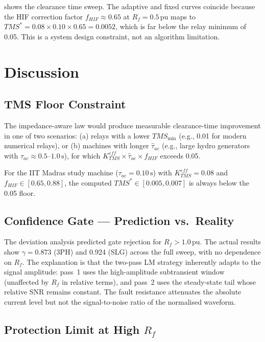 \documentclass[12pt,a4paper]{article}
\theoremstyle{definition}
\theoremstyle{plain}
\begin{document}
 shows the clearance time sweep.  The adaptive and fixed
curves coincide because the HIF correction factor $f_{HIF} \approx 0.65$
at $R_f = 0.5\,\text{pu}$ maps to $TMS^* = 0.08 \times 0.10 \times 0.65
= 0.0052$, which is far below the relay minimum of 0.05.  This is a
system design constraint, not an algorithm limitation.

\section{Discussion}
\label{sec:disc}

\subsection{TMS Floor Constraint}
\label{sec:disc:floor}

The impedance-aware law would produce measurable clearance-time improvement
in one of two scenarios: (a) relays with a lower $TMS_{\min}$ (e.g., 0.01 for
modern numerical relays), or (b) machines with longer $\hat{\tau}_{ac}$
(e.g., large hydro generators with $\tau_{ac} \approx 0.5$--$1.0\,\text{s}$),
for which $K_{TMS}^{eff} \times \hat{\tau}_{ac} \times f_{HIF}$ exceeds 0.05.

For the IIT Madras study machine ($\tau_{ac} = 0.10\,\text{s}$) with
$K_{TMS}^{eff} = 0.08$ and $f_{HIF} \in [0.65, 0.88]$, the computed $TMS^*
\in [0.005, 0.007]$ is always below the 0.05 floor.

\subsection{Confidence Gate — Prediction vs.\ Reality}
\label{sec:disc:gate}

The deviation analysis predicted gate rejection for $R_f > 1.0\,\text{pu}$.
The actual results show $\gamma = 0.873$ (3PH) and 0.924 (SLG) across the
full sweep, with no dependence on $R_f$.  The explanation is that the
two-pass LM strategy inherently adapts to the signal amplitude:
pass~1 uses the high-amplitude subtransient window (unaffected by $R_f$ in
relative terms), and pass~2 uses the steady-state tail whose relative SNR
remains constant.  The fault resistance attenuates the absolute current
level but not the signal-to-noise ratio of the normalised waveform.

\subsection{Protection Limit at High $R_f$}
\label{sec:disc:limit}
\end{document}
